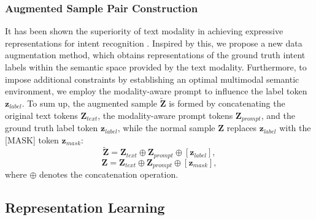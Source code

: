 \documentclass[letterpaper]{article} %
\begin{document}
\subsubsection{Augmented Sample Pair Construction}
It has been shown the superiority of text modality in achieving expressive representations for intent recognition \cite{zhang2021deep}. Inspired by this, we propose a new data augmentation method, which obtains representations of the ground truth intent labels within the semantic space provided by the text modality. Furthermore, to impose additional constraints by establishing an optimal multimodal semantic environment, we employ the modality-aware prompt to influence the label token $\textbf{z}_{label}$. To sum up, the augmented sample $\widetilde{\textbf{Z}}$ is formed by concatenating the original text tokens $\textbf{Z}_{text}$, the modality-aware prompt tokens $\textbf{Z}_{prompt}$, and the ground truth label token $\textbf{z}_{label}$, while the normal sample $\textbf{Z}$ replaces $\textbf{z}_{label}$ with the [MASK] token $\textbf{z}_{mask}$:
\begin{equation}
\widetilde{\textbf{Z}} = \textbf{Z}_{text} \oplus \textbf{Z}_{prompt} \oplus [\textbf{z}_{label}],
\end{equation}
\begin{equation}
\textbf{Z} = \textbf{Z}_{text} \oplus \textbf{Z}_{prompt} \oplus [\textbf{z}_{mask}],
\end{equation}
where $\oplus$ denotes the concatenation operation.

\subsection{Representation Learning}
\end{document}
